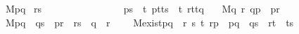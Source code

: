 \documentclass{llncs}
\begin{document}
\begin{isabellebody}
\ \ M{}{\isacharcolon}{\isachardoublequoteopen}{\isasymlbrakk}p{\isasymparallel}q {\isacharsemicolon}\  r{\isasymparallel}s{\isasymrbrakk}\ {\isasymLongrightarrow} \isanewline \ \ \ \ \ \ \ \ \ \ \ \  \ \ \ p{\isasymparallel}s\ {\isasymoplus}\ {\isacharparenleft}{\isacharparenleft}{\isasymexists}t{\isachardot}\ {\isacharparenleft}p{\isasymparallel}t{\isacharparenright}{\isasymand}{\isacharparenleft}t{\isasymparallel}s{\isacharparenright}{\isacharparenright}\ {\isasymoplus}\ {\isacharparenleft}{\isasymexists}t{\isachardot}\ {\isacharparenleft}r{\isasymparallel}t{\isacharparenright}{\isasymand}{\isacharparenleft}t{\isasymparallel}q{\isacharparenright}{\isacharparenright}{\isacharparenright}{\isachardoublequoteclose}\ \isanewline
\ \ M{}{\isacharcolon}{\isachardoublequoteopen}{\isacharparenleft}{\isasymexists}q\ r{\isachardot}\ q{\isasymparallel}p\ {\isasymand}\ p{\isasymparallel}r{\isacharparenright}{\isachardoublequoteclose}\ \isanewline
\ \ M{}{\isacharcolon}{\isachardoublequoteopen}{\isasymlbrakk}p{\isasymparallel}q\ {\isacharsemicolon}\ q{\isasymparallel}s\ {\isacharsemicolon}\ p{\isasymparallel}r\ {\isacharsemicolon}\ r{\isasymparallel}s{\isasymrbrakk}\ {\isasymLongrightarrow}\ q\ {\isacharequal}\ r{\isachardoublequoteclose}\ \ \isanewline
\ \ M{}exist{\isacharcolon}{\isachardoublequoteopen}p{\isasymparallel}q\ {\isasymLongrightarrow}\ {\isacharparenleft}{\isasymexists}r\ s\ t{\isachardot}\ r{\isasymparallel}p\ {\isasymand}\ p{\isasymparallel}q\ {\isasymand}\ q{\isasymparallel}s\ {\isasymand}\ r{\isasymparallel}t\ {\isasymand}\ t{\isasymparallel}s{\isacharparenright}{\isachardoublequoteclose}\isanewline
\end{isabellebody}

\end{document}

